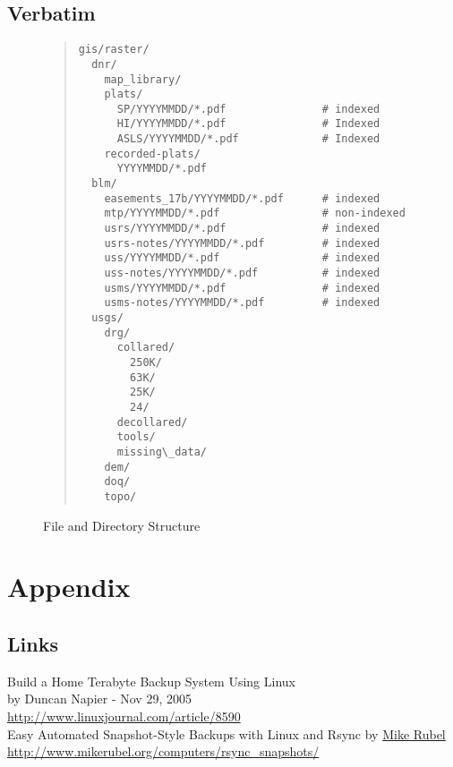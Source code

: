 \documentclass[12pt,letterpaper,dvips]{article}
\begin{document}
\newpage
\subsection{Verbatim}

\begin{center}
\begin{figure}
\begin{quote}
\small
\begin{Verbatim}[frame=none]
gis/raster/
  dnr/
    map_library/
    plats/
      SP/YYYYMMDD/*.pdf               # indexed
      HI/YYYYMMDD/*.pdf               # Indexed
      ASLS/YYYYMMDD/*.pdf             # Indexed
    recorded-plats/
      YYYYMMDD/*.pdf
  blm/
    easements_17b/YYYYMMDD/*.pdf      # indexed
    mtp/YYYYMMDD/*.pdf                # non-indexed
    usrs/YYYYMMDD/*.pdf               # indexed
    usrs-notes/YYYYMMDD/*.pdf         # indexed
    uss/YYYYMMDD/*.pdf                # indexed
    uss-notes/YYYYMMDD/*.pdf          # indexed
    usms/YYYYMMDD/*.pdf               # indexed
    usms-notes/YYYYMMDD/*.pdf         # indexed
  usgs/
    drg/
      collared/ 
        250K/
        63K/
        25K/
        24/
      decollared/
      tools/
      missing\_data/
    dem/
    doq/
    topo/
\end{Verbatim}
\normalsize
\end{quote}
\caption{File and Directory Structure}
\label{fig:dirlayout}
\end{figure}
\end{center}



\clearpage
\newpage
\section*{Appendix}

\subsection*{Links}
Build a Home Terabyte Backup System Using Linux\\
by Duncan Napier - Nov 29, 2005\\
\href{http://www.linuxjournal.com/article/8590}{http://www.linuxjournal.com/article/8590}\\

\noindent Easy Automated Snapshot-Style Backups with Linux and Rsync
by \href{http://www.mikerubel.org/}{Mike Rubel}\\
\href{http://www.mikerubel.org/computers/rsync_snapshots/}{http://www.mikerubel.org/computers/rsync\_snapshots/}\\

\end{document}
